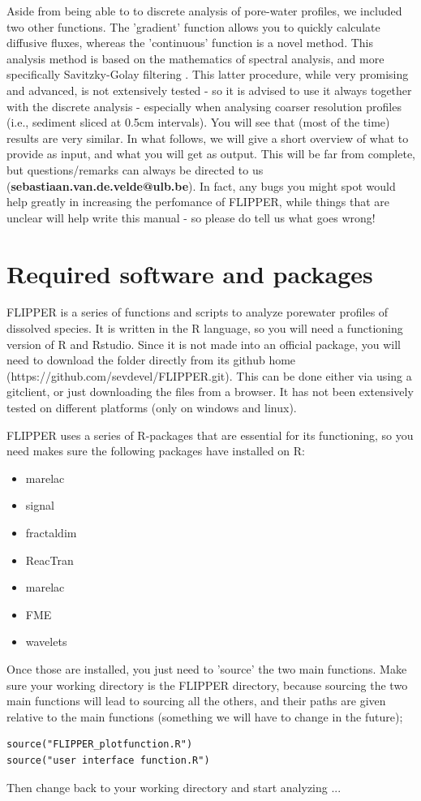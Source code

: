 \documentclass[10pt]{article}
\begin{document}
Aside from being able to to discrete analysis of pore-water profiles, we included two other functions. The 'gradient' function allows you to quickly calculate diffusive fluxes, whereas the 'continuous' function is a novel method. This analysis method is based on the mathematics of spectral analysis, and more specifically Savitzky-Golay filtering \cite{Savitzky1964}. This latter procedure, while very promising and advanced, is not extensively tested - so it is advised to use it always together with the discrete analysis - especially when analysing coarser resolution profiles (i.e., sediment sliced at 0.5cm intervals). You will see that (most of the time) results are very similar. In what follows, we will give a short overview of what to provide as input, and what you will get as output. This will be far from complete, but questions/remarks can always be directed to us (\textbf{sebastiaan.van.de.velde@ulb.be}). In fact, any bugs you might spot would help greatly in increasing the perfomance of FLIPPER, while things that are unclear will help write this manual - so please do tell us what goes wrong!

\section{Required software and packages}
\label{sect_software}

FLIPPER is a series of functions and scripts to analyze porewater profiles of dissolved species. It is written in the R language, so you will need a functioning version of R and Rstudio. Since it is not made into an official package, you will need to download the folder directly from its github home (https://github.com/sevdevel/FLIPPER.git). This can be done either via using a gitclient, or just downloading the files from a browser. It has not been extensively tested on different platforms (only on windows and linux).

FLIPPER uses a series of R-packages that are essential for its functioning, so you need makes sure the following packages have installed on R:
\begin{itemize}
\item marelac
\item signal
\item fractaldim
\item ReacTran
\item marelac
\item FME
\item wavelets
\end{itemize}
Once those are installed, you just need to 'source' the two main functions. Make sure your working directory is the FLIPPER directory, because sourcing the two main functions will lead to sourcing all the others, and their paths are given relative to the main functions (something we will have to change in the future);
\begin{verbatim}
source("FLIPPER_plotfunction.R")
source("user interface function.R")
\end{verbatim}
Then change back to your working directory and start analyzing ...
\end{document}
